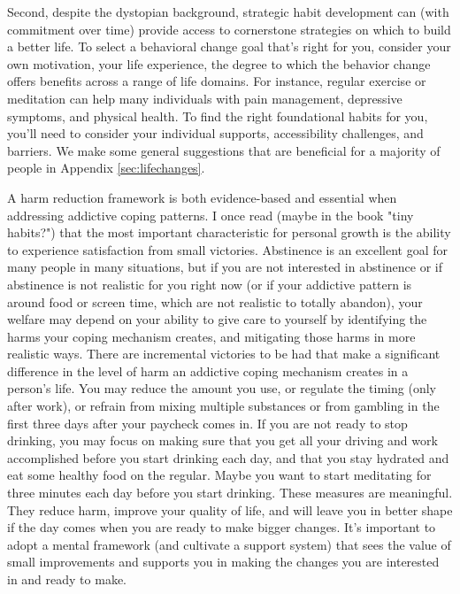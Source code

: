 \documentclass[12pt,letterpaper]{book}
\begin{document}
Second, despite the dystopian background, strategic habit development can (with commitment over time) provide access to cornerstone strategies on which to build a better life. To select a behavioral change goal that's right for you, consider your own motivation, your life experience, the degree to which the behavior change offers benefits across a range of life domains. For instance, regular exercise or meditation can help many individuals with pain management, depressive symptoms, and physical health. To find the right foundational habits for you, you'll need to consider your individual supports, accessibility challenges, and barriers. We make some general suggestions that are beneficial for a majority of people in Appendix \ref{sec:lifechanges}.

A harm reduction framework is both evidence-based and essential when addressing addictive coping patterns. I once read (maybe in the book "tiny habits?") that the most important characteristic for personal growth is the ability to experience satisfaction from small victories. Abstinence is an excellent goal for many people in many situations, but if you are not interested in abstinence or if abstinence is not realistic for you right now (or if your addictive pattern is around food or screen time, which are not realistic to totally abandon), your welfare may depend on your ability to give care to yourself by identifying the harms your coping mechanism creates, and mitigating those harms in more realistic ways. There are incremental victories to be had that make a significant difference in the level of harm an addictive coping mechanism creates in a person's life. You may reduce the amount you use, or regulate the timing (only after work), or refrain from mixing multiple substances or from gambling in the first three days after your paycheck comes in. If you are not ready to stop drinking, you may focus on making sure that you get all your driving and work accomplished before you start drinking each day, and that you stay hydrated and eat some healthy food on the regular. Maybe you want to start meditating for three minutes each day before you start drinking. These measures are meaningful. They reduce harm, improve your quality of life, and will leave you in better shape if the day comes when you are ready to make bigger changes. It's important to adopt a mental framework (and cultivate a support system) that sees the value of small improvements and supports you in making the changes you are interested in and ready to make.
\end{document}
